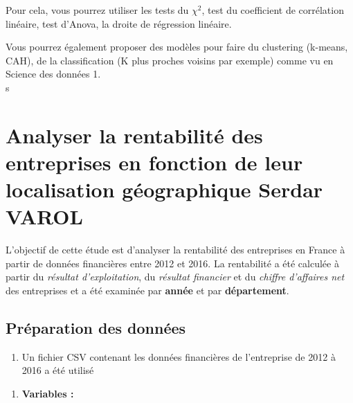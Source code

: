 \documentclass[mstat,12pt]{unswthesis}
\begin{document}
Pour cela, vous pourrez utiliser les tests du \(\chi^2\), test du
coefficient de corrélation linéaire, test d'Anova, la droite de
régression linéaire.

Vous pourrez également proposer des modèles pour faire du clustering
(k-means, CAH), de la classification (K plus proches voisins par
exemple) comme vu en Science des données 1.\\
s \newpage

\section{\texorpdfstring{\textbf{Analyser la rentabilité des entreprises
en fonction de leur localisation géographique} Serdar
VAROL}{Analyser la rentabilité des entreprises en fonction de leur localisation géographique Serdar VAROL}}\label{analyser-la-rentabilituxe9-des-entreprises-en-fonction-de-leur-localisation-guxe9ographique-serdar-varol}

\bigskip

L'objectif de cette étude est d'analyser la rentabilité des entreprises
en France à partir de données financières entre 2012 et 2016. La
rentabilité a été calculée à partir du \emph{résultat d'exploitation},
du \emph{résultat financier} et du \emph{chiffre d'affaires net} des
entreprises et a été examinée par \textbf{année} et par
\textbf{département}.

\medskip

\subsection{Préparation des
données}\label{pruxe9paration-des-donnuxe9es}

\medskip

\begin{enumerate}
\def\labelenumi{\arabic{enumi})}
\tightlist
\item
  Un fichier CSV contenant les données financières de l'entreprise de
  2012 à 2016 a été utilisé
\end{enumerate}

\small

\normalsize

\begin{enumerate}
\def\labelenumi{\arabic{enumi})}
\setcounter{enumi}{1}
\tightlist
\item
  \textbf{Variables :}
\end{enumerate}

\medskip
\end{document}
